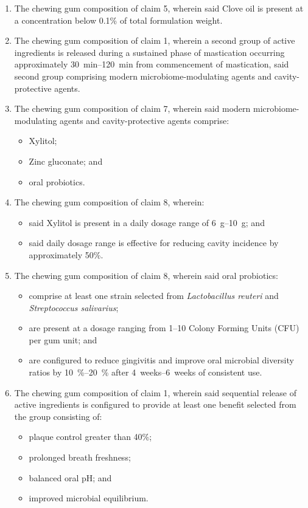 \documentclass[12pt]{article}
\begin{document}
\begin{enumerate}
    \item The chewing gum composition of claim 5, wherein said Clove oil is present at a concentration below 0.1\% of total formulation weight.

    \item The chewing gum composition of claim 1, wherein a second group of active ingredients is released during a sustained phase of mastication occurring approximately \SIrange{30}{120}{\minute} from commencement of mastication,
    said second group comprising modern microbiome-modulating agents and cavity-protective agents.

    \item The chewing gum composition of claim 7, wherein said modern microbiome-modulating agents and cavity-protective agents comprise:
    \begin{itemize}
        \item Xylitol;
        \item Zinc gluconate; and
        \item oral probiotics.
    \end{itemize}

    \item The chewing gum composition of claim 8, wherein:
    \begin{itemize}
        \item said Xylitol is present in a daily dosage range of \SIrange{6}{10}{\gram}; and
        \item said daily dosage range is effective for reducing cavity incidence by approximately 50\%.
    \end{itemize}

    \item The chewing gum composition of claim 8, wherein said oral probiotics:
    \begin{itemize}
        \item comprise at least one strain selected from \textit{Lactobacillus reuteri} and \textit{Streptococcus salivarius};
        \item are present at a dosage ranging from \SIrange{1}{10}{\billion} Colony Forming Units (CFU) per gum unit; and
        \item are configured to reduce gingivitis and improve oral microbial diversity ratios by \SIrange{10}{20}{\percent} after \SIrange{4}{6}{weeks} of consistent use.
    \end{itemize}

    \item The chewing gum composition of claim 1, wherein said sequential release of active ingredients is configured to provide at least one benefit selected from the group consisting of:
    \begin{itemize}
        \item plaque control greater than 40\%;
        \item prolonged breath freshness;
        \item balanced oral pH; and
        \item improved microbial equilibrium.
    \end{itemize}


\end{enumerate}
\end{document}
